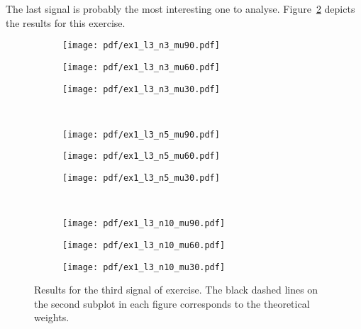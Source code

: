 The last signal is probably the most interesting one to analyse.
Figure~\ref{fig:ex1vsig3} depicts the results for this exercise.
\begin{figure}
    \centering
    \begin{subfigure}[t]{0.32\columnwidth}
        \centering
        \texttt{[image: pdf/ex1\_l3\_n3\_mu90.pdf]}
        \caption{}
    \end{subfigure} \hfill
    \begin{subfigure}[t]{0.32\columnwidth}
        \centering
        \texttt{[image: pdf/ex1\_l3\_n3\_mu60.pdf]}
        \caption{}
    \end{subfigure} \hfill
    \begin{subfigure}[t]{0.32\columnwidth}
        \centering
        \texttt{[image: pdf/ex1\_l3\_n3\_mu30.pdf]}
        \caption{}
    \end{subfigure} \\
    \begin{subfigure}[t]{0.32\columnwidth}
        \centering
        \texttt{[image: pdf/ex1\_l3\_n5\_mu90.pdf]}
        \caption{}
    \end{subfigure} \hfill
    \begin{subfigure}[t]{0.32\columnwidth}
        \centering
        \texttt{[image: pdf/ex1\_l3\_n5\_mu60.pdf]}
        \caption{}
    \end{subfigure} \hfill
    \begin{subfigure}[t]{0.32\columnwidth}
        \centering
        \texttt{[image: pdf/ex1\_l3\_n5\_mu30.pdf]}
        \caption{}
    \end{subfigure} \\
    \begin{subfigure}[t]{0.32\columnwidth}
        \centering
        \texttt{[image: pdf/ex1\_l3\_n10\_mu90.pdf]}
        \caption{}
    \end{subfigure} \hfill
    \begin{subfigure}[t]{0.32\columnwidth}
        \centering
        \texttt{[image: pdf/ex1\_l3\_n10\_mu60.pdf]}
        \caption{}
    \end{subfigure} \hfill
    \begin{subfigure}[t]{0.32\columnwidth}
        \centering
        \texttt{[image: pdf/ex1\_l3\_n10\_mu30.pdf]}
        \caption{\label{fig:ex1vsig3n10mu3}}
    \end{subfigure}
    \caption{Results for the third signal of exercise. The black dashed lines on
        the second subplot in each figure corresponds to the theoretical weights.
        \label{fig:ex1vsig3}}
\end{figure}

